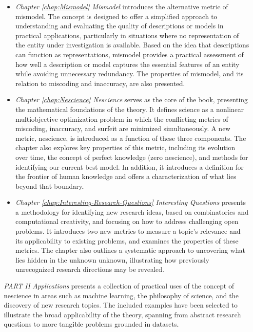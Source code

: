 \begin{itemize}
\item \emph{Chapter \ref{chap:Mismodel} Mismodel} introduces the alternative metric of mismodel. The concept is designed to offer a simplified approach to understanding and evaluating the quality of descriptions or models in practical applications, particularly in situations where no representation of the entity under investigation is available. Based on the idea that descriptions can function as representations, mismodel provides a practical assessment of how well a description or model captures the essential features of an entity while avoiding unnecessary redundancy. The properties of mismodel, and its relation to miscoding and inaccuracy, are also presented.

\item \emph{Chapter \ref{chap:Nescience} Nescience} serves as the core of the book, presenting the mathematical foundations of the theory. It defines science as a nonlinear multiobjective optimization problem in which the conflicting metrics of miscoding, inaccuracy, and surfeit are minimized simultaneously. A new metric, nescience, is introduced as a function of these three components. The chapter also explores key properties of this metric, including its evolution over time, the concept of perfect knowledge (zero nescience), and methods for identifying our current best model. In addition, it introduces a definition for the frontier of human knowledge and offers a characterization of what lies beyond that boundary.

\item \emph{Chapter \ref{chap:Interesting-Research-Questions} Interesting Questions} presents a methodology for identifying new research ideas, based on combinatorics and computational creativity, and focusing on how to address challenging open problems. It introduces two new metrics to measure a topic's relevance and its applicability to existing problems, and examines the properties of these metrics. The chapter also outlines a systematic approach to uncovering what lies hidden in the unknown unknown, illustrating how previously unrecognized research directions may be revealed.

\end{itemize}

\bigskip

\emph{PART II Applications} presents a collection of practical uses of the concept of nescience in areas such as machine learning, the philosophy of science, and the discovery of new research topics. The included examples have been selected to illustrate the broad applicability of the theory, spanning from abstract research questions to more tangible problems grounded in datasets.

